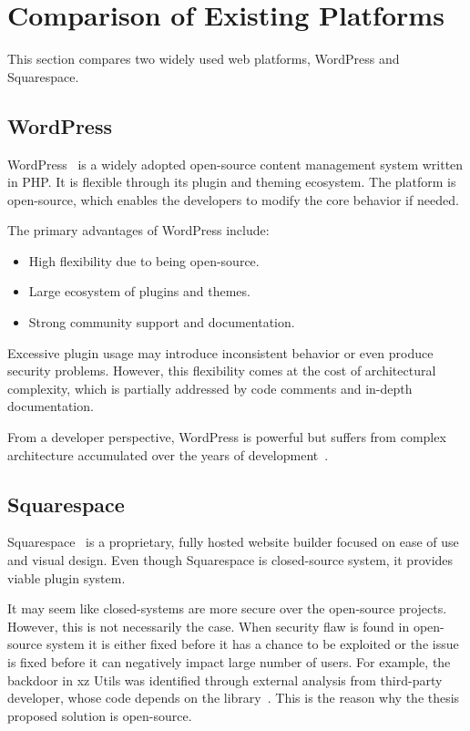 \section{Comparison of Existing Platforms}\label{sec:comparison-of-existing-platforms}
This section compares two widely used web platforms, WordPress and Squarespace.

\subsection{WordPress}\label{subsec:wordpress}
WordPress~\parencite{wordpress} is a widely adopted open-source content management system written in PHP\@.
It is flexible through its plugin and theming ecosystem.
The platform is open-source, which enables the developers to modify the core behavior if needed.

The primary advantages of WordPress include:

\begin{itemize}
    \item High flexibility due to being open-source.
    \item Large ecosystem of plugins and themes.
    \item Strong community support and documentation.
\end{itemize}

Excessive plugin usage may introduce inconsistent behavior or even produce security problems.
However, this flexibility comes at the cost of architectural complexity, which is partially addressed by code comments
and in-depth documentation.

From a developer perspective, WordPress is powerful but suffers from complex architecture accumulated over the years
of development~\parencite{wordpress_docs_rest}.

\subsection{Squarespace}\label{subsec:squarespace}
Squarespace~\parencite{squarespace} is a proprietary, fully hosted website builder focused on ease of use and visual design.
Even though Squarespace is closed-source system, it provides viable plugin system.

It may seem like closed-systems are more secure over the open-source projects.
However, this is not necessarily the case.
When security flaw is found in open-source system it is either fixed before it has a chance to be exploited
or the issue is fixed before it can negatively impact large number of users.
For example, the backdoor in xz Utils was identified through external analysis from third-party developer,
whose code depends on the library~\parencite{cve_2024_3094}.
This is the reason why the thesis proposed solution is open-source.

